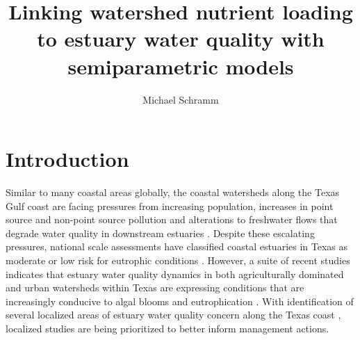 \documentclass[fleqn,10pt,lineno]{wlpeerj} %
\title{Linking watershed nutrient loading to estuary water quality with
semiparametric models}
\author[1]{Michael Schramm}
\affil[1]{Texas Water Resources Institute, Texas A\&M AgriLife Research,
College Station, Texas, United States}
\begin{document}
\flushbottom
\maketitle
\thispagestyle{empty}

\hypertarget{introduction}{%
\section*{Introduction}\label{introduction}}

Similar to many coastal areas globally, the coastal watersheds along the
Texas Gulf coast are facing pressures from increasing population,
increases in point source and non-point source pollution and alterations
to freshwater flows that degrade water quality in downstream estuaries
\autocite{bricker_effects_2008,kennicuttWaterQualityGulf2017,bugica_water_2020}.
Despite these escalating pressures, national scale assessments have
classified coastal estuaries in Texas as moderate or low risk for
eutrophic conditions \autocite{bricker_effects_2008}. However, a suite
of recent studies indicates that estuary water quality dynamics in both
agriculturally dominated and urban watersheds within Texas are
expressing conditions that are increasingly conducive to algal blooms
and eutrophication
\autocite{wetzWaterQualityDynamics2016,wetz_exceptionally_2017,bugica_water_2020,chinPhytoplanktonBiomassCommunity2022}.
With identification of several localized areas of estuary water quality
concern along the Texas coast \autocite{bugica_water_2020}, localized
studies are being prioritized to better inform management actions.
\end{document}
